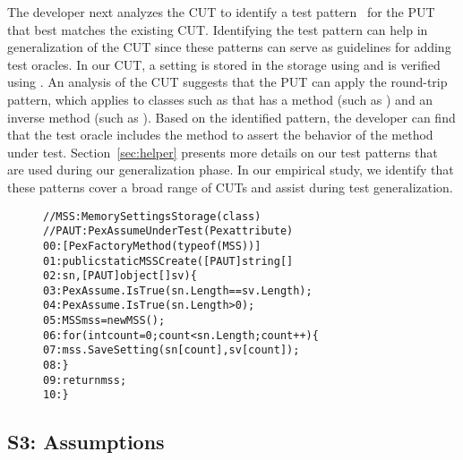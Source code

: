 The developer next analyzes the CUT to identify a test pattern~\cite{PEXDOC} for the PUT that best matches the existing CUT. Identifying the test pattern can help in generalization of the CUT since these patterns can serve as guidelines for adding test oracles. In our CUT, a setting is stored in the storage using  and is verified using . An analysis of the CUT suggests that the PUT can apply the round-trip pattern, which applies to classes such as  that has a method (such as ) and an inverse method (such as ). Based on the identified pattern, the developer can find that the test oracle  includes the  method to assert the behavior of the  method under test. Section~\ref{sec:helper} presents more details on our test patterns that are used during our generalization phase. In our empirical study, we identify that these patterns cover a broad range of CUTs and assist during test generalization.

\begin{figure}[t]
\begin{CodeOut}
\begin{alltt}
//MSS: MemorySettingsStorage (class)
//PAUT: PexAssumeUnderTest	(Pex attribute)
00:[PexFactoryMethod(typeof(MSS))]
01:public static MSS Create([PAUT]string[] 
02:\hspace*{0.3in}sn, [PAUT]object[] sv) \{
03:\hspace*{0.2in}PexAssume.IsTrue(sn.Length == sv.Length);
04:\hspace*{0.2in}PexAssume.IsTrue(sn.Length > 0);
05:\hspace*{0.2in}MSS mss = new MSS();
06:\hspace*{0.2in}for (int count = 0; count < sn.Length; count++) \{
07:\hspace*{0.3in}mss.SaveSetting(sn[count], sv[count]);
08:\hspace*{0.2in}\}
09:\hspace*{0.2in}return mss;
10:\}
\end{alltt}
\end{CodeOut} 
\end{figure}

\subsection{S3: Assumptions}

